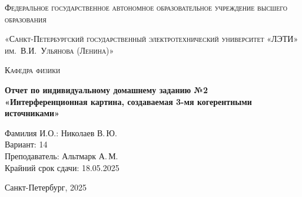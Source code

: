 \begin{titlepage}
  \centering
  {\scshape Федеральное государственное автономное образовательное учреждение высшего образования\par}
  {\scshape «Санкт-Петербургский государственный электротехнический университет «ЛЭТИ» им.~В.И.~Ульянова (Ленина)»\par}
  \vspace{1cm}
  {\scshape Кафедра физики\par}
  \vspace{2cm}
  {\LARGE\bfseries Отчет по индивидуальному домашнему заданию №2\\
    «Интерференционная картина, создаваемая 3-мя когерентными источниками»\par}
  \vfill
  \begin{flushleft}
    Фамилия И.О.: Николаев В.\,Ю.\\
    Вариант: 14\\
    Преподаватель: Альтмарк А.\,М.\\
    Крайний срок сдачи: 18.05.2025
  \end{flushleft}
  \vfill
  {\large Санкт-Петербург, 2025\par}
\end{titlepage}
